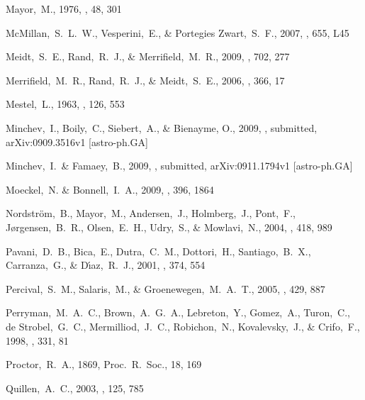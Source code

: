 \begin{thebibliography}{99}
  Mayor,~M., 1976,
  \aap, 48, 301

  McMillan,~S.~L.~W., Vesperini,~E., \& Portegies Zwart,~S.~F., 2007,
  \apjl, 655, L45

  Meidt,~S.~E., Rand,~R.~J., \& Merrifield,~M.~R., 2009,
  \apj, 702, 277

  Merrifield,~M.~R., Rand,~R.~J., \& Meidt,~S.~E., 2006,
  \mnras, 366, 17

  Mestel,~L., 1963,
  \mnras, 126, 553

  Minchev,~I., Boily,~C., Siebert,~A., \& Bienayme, O., 2009,
  \mnras, submitted,
  arXiv:0909.3516v1 [astro-ph.GA]

  Minchev,~I.~\& Famaey,~B., 2009,
  \apjl, submitted,
  arXiv:0911.1794v1 [astro-ph.GA]

  Moeckel,~N. \& Bonnell,~I.~A., 2009,
  \mnras, 396, 1864

  Nordstr{\"o}m,~B., Mayor,~M., Andersen,~J., Holmberg,~J., Pont,~F., J{\o}rgensen,~B.~R., Olsen,~E.~H., Udry,~S., \& Mowlavi,~N., 2004,
    \aap, 418, 989

  Pavani,~D.~B., Bica,~E., Dutra,~C.~M., Dottori,~H., Santiago,~B.~X., Carranza,~G., \& D{\'{\i}}az,~R.~J., 2001,
  \aap, 374, 554

  Percival,~S.~M., Salaris,~M., \& Groenewegen,~M.~A.~T., 2005,
  \aap, 429, 887

  Perryman,~M.~A.~C., Brown,~A.~G.~A., Lebreton,~Y., Gomez,~A., Turon,~C., de Strobel,~G.~C., Mermilliod,~J.~C., Robichon,~N., Kovalevsky,~J., \& Crifo,~F., 1998,
  \aap, 331, 81

  Proctor,~R.~A., 1869, Proc.~R.~Soc., 18, 169

  Quillen,~A.~C., 2003, 
  \aj, 125, 785


\end{thebibliography}
